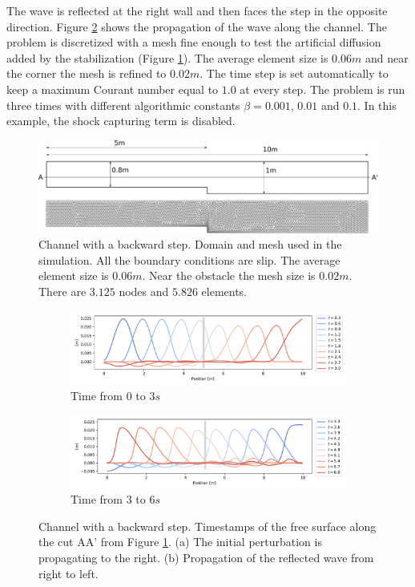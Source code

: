 The wave is reflected at the right wall and then faces the step in the opposite direction.
Figure \ref{waves_propagation} shows the propagation of the wave along the channel.
The problem is discretized with a mesh fine enough to test the artificial diffusion added by the stabilization (Figure \ref{step_mesh}). The average element size is $0.06m$ and near the corner the mesh is refined to $0.02m$.
The time step is set automatically to keep a maximum Courant number equal to $1.0$ at every step. The problem is run three times with different algorithmic constants $\beta = 0.001$, $0.01$ and $0.1$. In this example, the shock capturing term is disabled.

\begin{figure}
    \includegraphics[width=\textwidth]{img/eulerian/step/geometry.pdf}
    \caption{Channel with a backward step. Domain and mesh used in the simulation. All the boundary conditions are slip. The average element size is $0.06m$. Near the obstacle the mesh size is $0.02m$. There are $3.125$ nodes and $5.826$ elements.}
    \label{step_mesh}
\end{figure}

\begin{figure}[H]
\begin{subfigure}{\textwidth}
    \centering
    \includegraphics[width=\textwidth]{img/eulerian/step/free_surface_1.pdf}
    \caption{Time from $0$ to $3s$}
\end{subfigure}
\begin{subfigure}{\textwidth}
    \centering
    \includegraphics[width=\textwidth]{img/eulerian/step/free_surface_2.pdf}
    \caption{Time from $3$ to $6s$}
\end{subfigure}
\caption{Channel with a backward step. Timestamps of the free surface along the cut AA' from Figure \ref{step_mesh}. (a) The initial perturbation is propagating to the right. (b) Propagation of the reflected wave from right to left.}
\label{waves_propagation}
\end{figure}


